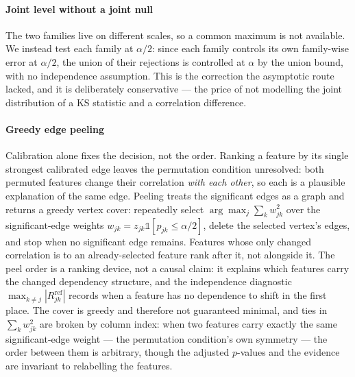 \paragraph{Joint level without a joint null}
The two families live on different scales, so a common maximum is not available. We
instead test each family at $\alpha/2$: since each family controls its own family-wise
error at $\alpha/2$, the union of their rejections is controlled at $\alpha$ by the union
bound, with no independence assumption. This is the correction the asymptotic route
lacked, and it is deliberately conservative --- the price of not modelling the joint
distribution of a KS statistic and a correlation difference.

\paragraph{Greedy edge peeling}
Calibration alone fixes the decision, not the order. Ranking a feature by its single
strongest calibrated edge leaves the permutation condition unresolved: both permuted
features change their correlation \emph{with each other}, so each is a plausible
explanation of the same edge. Peeling treats the significant edges as a graph and
returns a greedy vertex cover: repeatedly select $\arg\max_j \sum_k w_{jk}^2$ over the
significant-edge weights $w_{jk} = z_{jk} \mathbb{1}[p_{jk} \le \alpha/2]$, delete the
selected vertex's edges, and stop when no significant edge remains. Features whose only
changed correlation is to an already-selected feature rank after it, not alongside it.
The peel order is a ranking device, not a causal claim: it explains which features carry
the changed dependency structure, and the independence diagnostic
$\max_{k \ne j} |R^{\text{ref}}_{jk}|$ records when a feature has no dependence to shift
in the first place. The cover is greedy and therefore not guaranteed minimal, and ties in
$\sum_k w_{jk}^2$ are broken by column index: when two features carry exactly the same
significant-edge weight --- the permutation condition's own symmetry --- the order between
them is arbitrary, though the adjusted $p$-values and the evidence are invariant to
relabelling the features.
